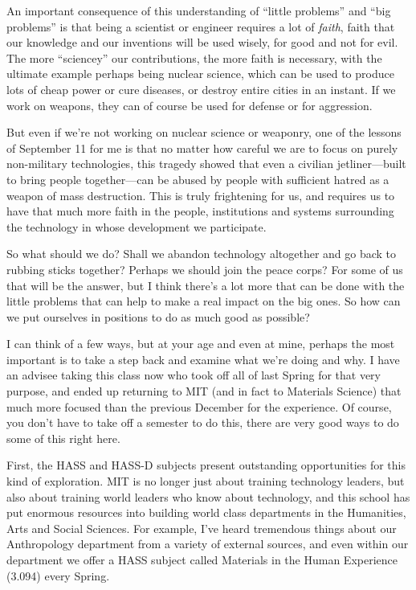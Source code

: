 \documentclass{report}
\begin{document}
An important consequence of this understanding of ``little problems'' and ``big
problems'' is that being a scientist or engineer requires a lot of {\em faith},
faith that our knowledge and our inventions will be used wisely, for good and
not for evil.  The more ``sciencey'' our contributions, the more faith is
necessary, with the ultimate example perhaps being nuclear science, which can
be used to produce lots of cheap power or cure diseases, or destroy entire
cities in an instant.  If we work on weapons, they can of course be used for
defense or for aggression.

But even if we're not working on nuclear science or weaponry, one of the
lessons of September 11 for me is that no matter how careful we are to focus on
purely non-military technologies, this tragedy showed that even a civilian
jetliner---built to bring people together---can be abused by people with
sufficient hatred as a weapon of mass destruction.  This is truly frightening
for us, and requires us to have that much more faith in the people,
institutions and systems surrounding the technology in whose development we
participate.

So what should we do?  Shall we abandon technology altogether and go back to
rubbing sticks together?  Perhaps we should join the peace corps?  For some of
us that will be the answer, but I think there's a lot more that can be done
with the little problems that can help to make a real impact on the big ones.
So how can we put ourselves in positions to do as much good as possible?

I can think of a few ways, but at your age and even at mine, perhaps the most
important is to take a step back and examine what we're doing and why.  I have
an advisee taking this class now who took off all of last Spring for that very
purpose, and ended up returning to MIT (and in fact to Materials Science) that
much more focused than the previous December for the experience.  Of course,
you don't have to take off a semester to do this, there are very good ways to
do some of this right here.

First, the HASS and HASS-D subjects present outstanding opportunities for this
kind of exploration.  MIT is no longer just about training technology leaders,
but also about training world leaders who know about technology, and this
school has put enormous resources into building world class departments in the
Humanities, Arts and Social Sciences.  For example, I've heard tremendous
things about our Anthropology department from a variety of external sources,
and even within our department we offer a HASS subject called Materials in the
Human Experience (3.094) every Spring.
\end{document}
